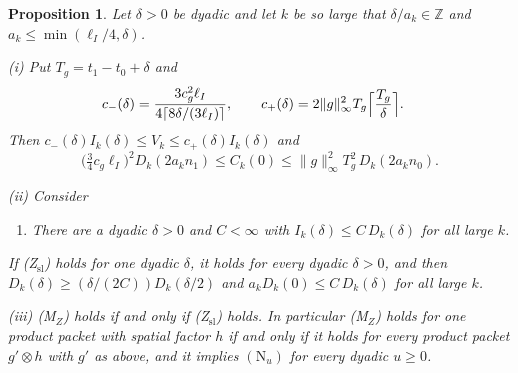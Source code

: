 \documentclass[aps,prd,twocolumn,superscriptaddress,nofootinbib,longbibliography,floatfix,amsmath,amssymb,10pt]{revtex4-2}
\newtheorem{proposition}[theorem]{Proposition}
\theoremstyle{definition}
\theoremstyle{remark}
\newcommand{\Z}{\mathbb{Z}}
\begin{document}
\begin{proposition}\label{prop:mzslice}
Let $\delta>0$ be dyadic and let $k$ be so large that $\delta/a_k\in\Z$ and
$a_k\le\min(\ell_I/4,\delta)$.

\textup{(i)} Put $T_g=t_1-t_0+\delta$ and
\[
\begin{split}
c_-(\delta)&=\frac{3c_g^2\ell_I}{4\lceil8\delta/(3\ell_I)\rceil},\qquad
c_+(\delta)=2\|g\|_\infty^2T_g\Bigl\lceil\frac{T_g}\delta\Bigr\rceil.
\end{split}
\]
Then $c_-(\delta)I_k(\delta)\le V_k\le c_+(\delta)I_k(\delta)$ and
\[
\bigl(\tfrac34c_g\ell_I\bigr)^2D_k(2a_kn_1)\le C_k(0)\le
\|g\|_\infty^2T_g^2\,D_k(2a_kn_0) .
\]

\textup{(ii)} Consider
\begin{enumerate}[label=\textup{(Z$_{\mathrm{sl}}$)},leftmargin=*]
\item There are a dyadic $\delta>0$ and $C<\infty$ with
$I_k(\delta)\le C\,D_k(\delta)$ for all large $k$.
\end{enumerate}
If \textup{(Z$_{\mathrm{sl}}$)} holds for one dyadic $\delta$, it holds for
every dyadic $\delta>0$, and then $D_k(\delta)\ge(\delta/(2C))D_k(\delta/2)$
and $a_kD_k(0)\le C\,D_k(\delta)$ for all large $k$.

\textup{(iii)} \textup{(M$_Z$)} holds if and only if
\textup{(Z$_{\mathrm{sl}}$)} holds. In particular \textup{(M$_Z$)} holds for
one product packet with spatial factor $h$ if and only if it holds for every
product packet $g'\otimes h$ with $g'$ as above, and it implies
$(\mathrm N_u)$ for every dyadic $u\ge0$.
\end{proposition}
\end{document}
